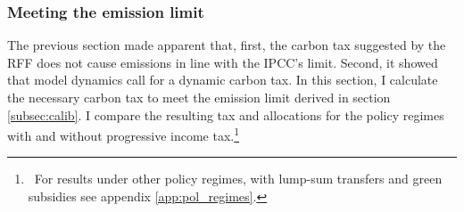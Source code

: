   
 \subsubsection{Meeting the emission limit}\label{subsec:meetlim}
 
 The previous section made apparent that, first, the carbon tax suggested by the RFF does not cause emissions in line with the IPCC's limit.  Second, it showed that model dynamics call for a dynamic carbon tax. In this section, I calculate the necessary carbon tax to meet the emission limit derived in section \ref{subsec:calib}. I compare the resulting tax and allocations for the policy regimes with and without progressive income tax.\footnote{\ For results under other policy regimes, with lump-sum transfers and green subsidies see appendix \ref{app:pol_regimes}. }
 

